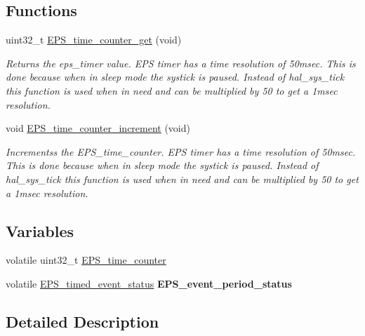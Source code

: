 \subsection*{Functions}
\begin{DoxyCompactItemize}
\item 
uint32\-\_\-t \hyperlink{group__eps__time_gafc4bbe218c73c1b84d1fd256309e6cf2}{E\-P\-S\-\_\-time\-\_\-counter\-\_\-get} (void)
\begin{DoxyCompactList}\small\item\em Returns the eps\-\_\-timer value. E\-P\-S timer has a time resolution of 50msec. This is done because when in sleep mode the systick is paused. Instead of hal\-\_\-sys\-\_\-tick this function is used when in need and can be multiplied by 50 to get a 1msec resolution. \end{DoxyCompactList}\item 
void \hyperlink{group__eps__time_ga06794a87db28fcff055b67f7485f3e67}{E\-P\-S\-\_\-time\-\_\-counter\-\_\-increment} (void)
\begin{DoxyCompactList}\small\item\em Incrementss the E\-P\-S\-\_\-time\-\_\-counter. E\-P\-S timer has a time resolution of 50msec. This is done because when in sleep mode the systick is paused. Instead of hal\-\_\-sys\-\_\-tick this function is used when in need and can be multiplied by 50 to get a 1msec resolution. \end{DoxyCompactList}\end{DoxyCompactItemize}
\subsection*{Variables}
\begin{DoxyCompactItemize}
\item 
volatile uint32\-\_\-t \hyperlink{group__eps__time_ga7ecc06961ad259810b3ffa53c5425300}{E\-P\-S\-\_\-time\-\_\-counter}
\item 
\hypertarget{group__eps__time_ga2dd3768eb272587ff5dee56951315220}{volatile \hyperlink{group__eps__time_ga8a08e679766a496bf509cdc16a4041d9}{E\-P\-S\-\_\-timed\-\_\-event\-\_\-status} {\bfseries E\-P\-S\-\_\-event\-\_\-period\-\_\-status}}\label{group__eps__time_ga2dd3768eb272587ff5dee56951315220}

\end{DoxyCompactItemize}


\subsection{Detailed Description}


